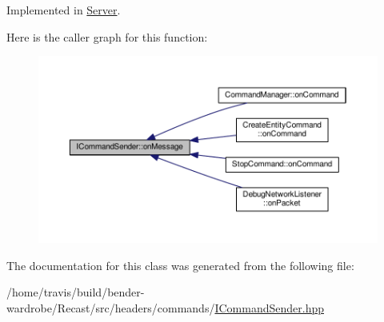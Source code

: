 Implemented in \hyperlink{class_server_a37a56fedea3137e9b8080ee0e86e8278}{Server}.



Here is the caller graph for this function\-:
\nopagebreak
\begin{figure}[H]
\begin{center}
\leavevmode
\includegraphics[width=350pt]{class_i_command_sender_a613b27b190c7fb5123597939c0896080_icgraph}
\end{center}
\end{figure}




The documentation for this class was generated from the following file\-:\begin{DoxyCompactItemize}
\item 
/home/travis/build/bender-\/wardrobe/\-Recast/src/headers/commands/\hyperlink{_i_command_sender_8hpp}{I\-Command\-Sender.\-hpp}\end{DoxyCompactItemize}
